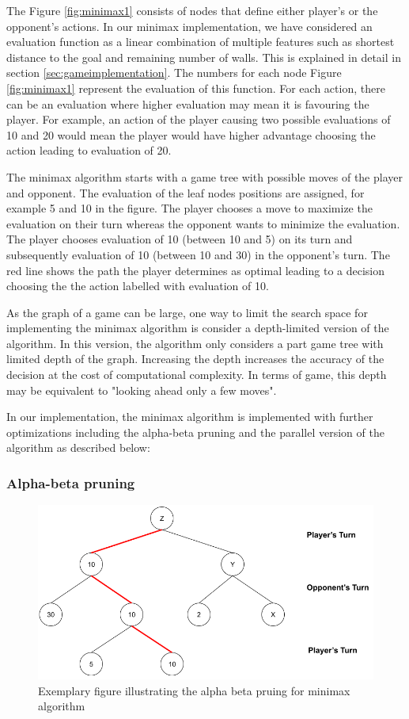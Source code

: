 The Figure \ref{fig:minimax1} consists of nodes that define either player's or the opponent's actions. In our minimax implementation, we have considered an evaluation function as a linear combination of multiple features such as shortest distance to the goal and remaining number of walls. This is explained in detail in section \ref{sec:gameimplementation}. The numbers for each node Figure \ref{fig:minimax1} represent the evaluation of this function. For each action, there can be an evaluation where higher evaluation may mean it is favouring the player. For example, an action of the player causing two possible evaluations of 10 and 20 would mean the player would have higher advantage choosing the action leading to evaluation of 20. 

The minimax algorithm starts with a game tree with possible moves of the player and opponent. The evaluation of the leaf nodes positions are assigned, for example 5 and 10 in the figure. The player chooses a move to maximize the evaluation on their turn whereas the opponent wants to minimize the evaluation. The player chooses evaluation of 10 (between 10 and 5) on its turn and subsequently evaluation of 10 (between 10 and 30) in the opponent's turn. The red line shows the path the player determines as optimal leading to a decision choosing the the action labelled with evaluation of 10.


As the graph of a game can be large, one way to limit the search space for implementing the minimax algorithm is consider a depth-limited version of the algorithm. In this version, the algorithm only considers a part game tree with limited depth of the graph. Increasing the depth increases the accuracy of the decision at the cost of computational complexity. In terms of game, this depth may be equivalent to "looking ahead only a few moves".

In our implementation, the minimax algorithm is implemented with further optimizations including the alpha-beta pruning and the parallel version of the algorithm as described below:

\subsubsection{Alpha-beta pruning}

\begin{figure}[!ht]
    \centering
    \includegraphics[width=\linewidth]{../img/Minimax2.png}
    \caption{Exemplary figure illustrating the alpha beta pruing for minimax algorithm}
    \label{fig:minimax2}
\end{figure}

